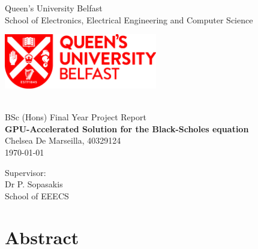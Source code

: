 \documentclass[a4paper,12pt]{report}
\begin{document}
    \begin{titlepage}
    \thispagestyle{empty}
    \begin{center}
        {Queen's University Belfast}\\[0.4cm]
        {School of Electronics, Electrical Engineering and Computer Science}\\[1cm]
        \hbox{}\hfill
        \begin{minipage}[t]{\textwidth}
        \begin{center}
            \includegraphics[width=0.5\textwidth]{figures/logo.jpg}
        \end{center}
        \end{minipage}
        \hfill\hbox{}
        \\[3cm]
        {\large BSc (Hons) Final Year Project Report\\[0.3cm]}
        {\LARGE \bfseries \biolinum GPU-Accelerated Solution for the Black-Scholes equation \\[3cm]}
        {\large Chelsea De Marseilla, 40329124}\\[0.4cm]
        {\large \today}
    \end{center}
    \vspace*{\fill}
    \begin{minipage}[t]{0.48\textwidth}
        {Supervisor:}\\[0.3cm]
        {\large Dr P. Sopasakis}\\[0.1cm]
        School of EEECS
    \end{minipage}
    \hfill
\end{titlepage}


\clearpage
\setcounter{page}{0}

\newpage
{}
\chapter*{Abstract}


\pagebreak
\tableofcontents
\pagebreak



\end{document}
